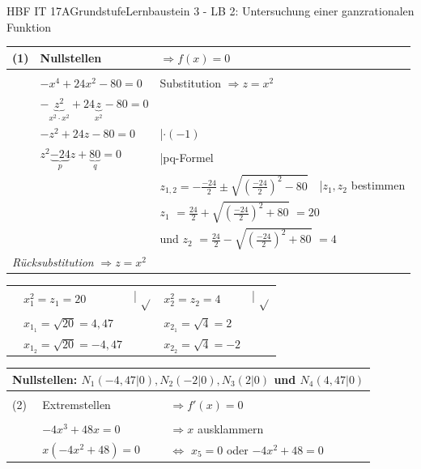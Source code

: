 \documentclass[oneside,openany,headings=optiontotoc,11pt,numbers=noenddot]{scrreprt}
\begin{document}
\begin{worksheet}{HBF IT 17A}{Grundstufe}{Lernbaustein 3 - LB 2: Untersuchung einer ganzrationalen Funktion}
\begin{framed}
			\begin{tabularx}{\textwidth}{lXXl}
				(1) & Nullstellen & \(\Rightarrow f(x) = 0\)\\
				\hline\\
				& \(-x^4 +24x^2-80 = 0\) & Substitution \(\Rightarrow z = x^2\)\\
				& \(-\underbrace{z^2}_{x^2\cdot x^2} + 24\underbrace{z}_{x^2} -80 = 0\)\\
				& \(-z^2  +24z -80 = 0\) & |\(\cdot(-1)\)\\
				& \(z^2  \underbrace{-24}_{p}z +\underbrace{80}_{q} = 0\) & |pq-Formel\\
				& & \(z_{1,2} = -\frac{-24}{2} \pm \sqrt{\left(\frac{-24}{2}\right)^2 -80}\) & |\(z_1,z_2\) bestimmen\\
				& & \multicolumn{2}{l}{\colorbox{green!10}{\(z_1\)} \(= \frac{24}{2} + \sqrt{\left(\frac{-24}{2}\right)^2 +80}\) \colorbox{green!10}{\(= 20\)}}\\
				& & \multicolumn{2}{l}{und \colorbox{green!10}{\(z_2\)} \(= \frac{24}{2} - \sqrt{\left(\frac{-24}{2}\right)^2 +80}\) \colorbox{green!10}{\(=4\)}}\\
				\multicolumn{4}{l}{\textit{Rücksubstitution} \(\Rightarrow z = x^2\)}\\
			\end{tabularx}
			\begin{tabularx}{\textwidth}{lXlXl}
				& \(x^2_1 = z_1 = 20\) & | \(\sqrt{}\) & \(x^2_2 = z_2 = 4\) &| \(\sqrt{}\)\\
				& \colorbox{blue!5}{\(x_{1_{1}} = \sqrt{20} = 4,47\)} & & \colorbox{blue!5}{\(x_{2_{1}} = \sqrt{4} = 2\)}\\
				& \colorbox{blue!5}{\(x_{1_{2}} = \sqrt{20} = -4,47\)} & & \colorbox{blue!5}{\(x_{2_{2}} = \sqrt{4} = -2\)}\\
			\end{tabularx}
			\begin{tabularx}{\textwidth}{lXXl}
				\multicolumn{4}{l}{Nullstellen: \colorbox{blue!5}{\(N_1(-4,47|0), N_2(-2|0), N_3(2|0)\)} und \colorbox{blue!5}{\(N_4(4,47|0)\)}}\\
				\hline\hline\\
				(2) & Extremstellen & \(\Rightarrow f'(x) = 0\)\\
				\hline\\
				& \(-4x^3+48x = 0\) & \(\Rightarrow x\) ausklammern\\
				& \(x(-4x^2+48) = 0\) & \(\Leftrightarrow \) \colorbox{blue!5}{\(x_5 = 0\)} oder \(-4x^2+48 = 0\)\\

\end{tabularx}
\end{framed}
\end{worksheet}
\end{document}
